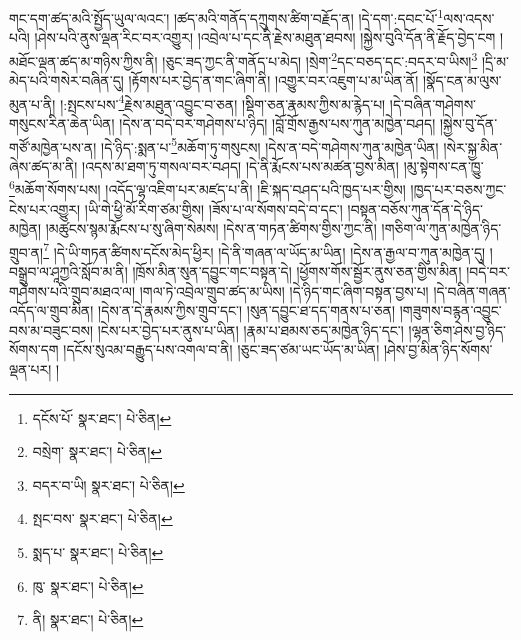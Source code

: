 གང་དག་ཚད་མའི་སྤྱོད་ཡུལ་ལའང་། །ཚད་མའི་གནོད་དཀྲུགས་ཚིག་བརྗོད་ན། །དེ་དག་:དབང་པོ་\footnote{དངོས་པོ་  སྣར་ཐང་།  པེ་ཅིན། }ལས་འདས་པའི། །ཤེས་པའི་ནུས་ལྡན་རིང་བར་འགྱུར། །འབྲེལ་པ་དང་ནི་རྗེས་མཐུན་ཐབས། །སྐྱེས་བུའི་དོན་ནི་རྗོད་བྱེད་ངག །མཐོང་ལྡན་ཚད་མ་གཉིས་ཀྱིས་ནི། །ཅུང་ཟད་ཀྱང་ནི་གནོད་པ་མེད། །སྲེག་\footnote{བསྲེག་  སྣར་ཐང་།  པེ་ཅིན། }དང་བཅད་དང་:བདར་བ་ཡིས།\footnote{བདར་བ་ཡི།  སྣར་ཐང་།  པེ་ཅིན། } །དྲི་མ་མེད་པའི་གསེར་བཞིན་དུ། །རྟོགས་པར་བྱེད་ན་གང་ཞིག་ནི། །འགྱུར་བར་འཇུག་པ་མ་ཡིན་ནོ། །སྣོད་ངན་མ་ལུས་མུན་པ་ནི། །:སྤངས་པས་\footnote{སྤང་བས་  སྣར་ཐང་།  པེ་ཅིན། }རྗེས་མཐུན་འབྱུང་བ་ཅན། །སྡིག་ཅན་རྣམས་ཀྱིས་མ་རྙེད་པ། །དེ་བཞིན་གཤེགས་གསུངས་རིན་ཆེན་ཡིན། །དེས་ན་བདེ་བར་གཤེགས་པ་ཉིད། །བློ་གྲོས་རྒྱས་པས་ཀུན་མཁྱེན་བཤད། །སྐྱེས་བུ་དོན་གཙོ་མཁྱེན་པས་ན། །དེ་ཉིད་:སྨན་པ་\footnote{སྨད་པ་  སྣར་ཐང་།  པེ་ཅིན། }མཆོག་ཏུ་གསུངས། །དེས་ན་བདེ་གཤེགས་ཀུན་མཁྱེན་ཡིན། །སེར་སྐྱ་མིན་ཞེས་ཚད་མ་ནི། །འདས་མ་ཐག་ཏུ་གསལ་བར་བཤད། །དེ་ནི་རྨོངས་པས་མཚན་བྱས་མིན། །མུ་སྟེགས་ངན་ཁྱུ་\footnote{ཁུ་  སྣར་ཐང་།  པེ་ཅིན། }མཆོག་སོགས་པས། །འདོད་ལྷ་འཇིག་པར་མཛད་པ་ནི། །ཇི་སྐད་བཤད་པའི་ཁྱད་པར་གྱིས། །ཁྱད་པར་བཅས་ཀྱང་ངེས་པར་འགྱུར། །ཡི་གེ་ཕྱི་མོ་རིག་ཙམ་གྱིས། །ཟོས་པ་ལ་སོགས་བདེ་བ་དང་། །བསྟན་བཅོས་ཀུན་དོན་དེ་ཉིད་མཁྱེན། །མཚུངས་སྙམ་རྨོངས་པ་སུ་ཞིག་སེམས། །དེས་ན་གཏན་ཚིགས་གྱིས་ཀྱང་ནི། །གཅིག་ལ་ཀུན་མཁྱེན་ཉིད་གྲུབ་ན།\footnote{ནི།  སྣར་ཐང་།  པེ་ཅིན། } །དེ་ཡི་གཏན་ཚིགས་དངོས་མེད་ཕྱིར། །དེ་ནི་གཞན་ལ་ཡོད་མ་ཡིན། །དེས་ན་རྒྱལ་བ་ཀུན་མཁྱེན་དུ། །བསྒྲུབ་ལ་ཤཱཀྱའི་སློབ་མ་ནི། །ཁྲོས་མིན་སུན་དབྱུང་གང་བསྟན་དེ། །ཕྱོགས་གོས་སྦྱོར་ནུས་ཅན་གྱིས་མིན། །བདེ་བར་གཤེགས་པའི་གྲུབ་མཐའ་ལ། །གལ་ཏེ་འབྲེལ་གྲུབ་ཚད་མ་ཡིས། །དེ་ཉིད་གང་ཞིག་བསྟན་བྱས་པ། །དེ་བཞིན་གཞན་འདོད་ལ་གྲུབ་མིན། །དེས་ན་དེ་རྣམས་ཀྱིས་གྲུབ་དང་། །སུན་དབྱུང་ཐ་དད་གནས་པ་ཅན། །གཟུགས་བརྙན་འབྱུང་བས་མ་བཟུང་བས། །ངེས་པར་བྱེད་པར་ནུས་པ་ཡིན། །རྣམ་པ་ཐམས་ཅད་མཁྱེན་ཉིད་དང་། །ལྷན་ཅིག་ཤེས་བྱ་ཉིད་སོགས་དག །དངོས་སུའམ་བརྒྱུད་པས་འགལ་བ་ནི། །ཅུང་ཟད་ཙམ་ཡང་ཡོད་མ་ཡིན། །ཤེས་བྱ་མིན་ཉིད་སོགས་ལྡན་པར། །
